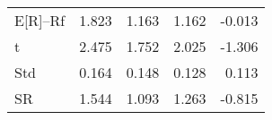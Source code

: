 \begin{tabular}{lrrrr}
\toprule
\midrule
E[R]--Rf & 1.823 & 1.163 & 1.162 & -0.013 \\
t & 2.475 & 1.752 & 2.025 & -1.306 \\
Std & 0.164 & 0.148 & 0.128 & 0.113 \\
SR & 1.544 & 1.093 & 1.263 & -0.815 \\
\bottomrule
\end{tabular}
